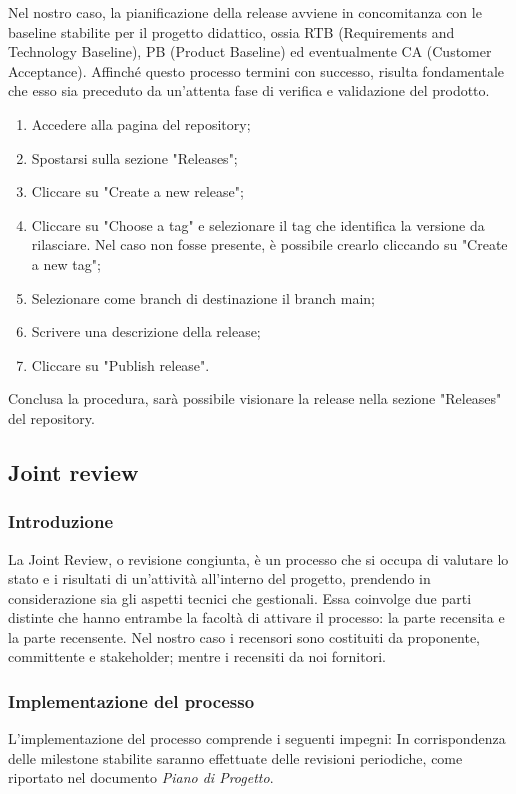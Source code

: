 Nel nostro caso, la pianificazione della release avviene in concomitanza con le baseline stabilite per il progetto didattico, ossia
RTB (Requirements and Technology Baseline),
PB (Product Baseline) ed eventualmente CA (Customer Acceptance).
Affinché questo processo termini con successo, risulta fondamentale che esso sia preceduto da un'attenta fase di verifica e validazione del prodotto.

\begin{enumerate}
	\item Accedere alla pagina del repository;
	\item Spostarsi sulla sezione "Releases";
	\item Cliccare su "Create a new release";
	\item Cliccare su "Choose a tag" e selezionare il tag che identifica la versione da rilasciare. Nel caso non fosse presente, è possibile
	      crearlo cliccando su "Create a new tag";
	\item Selezionare come branch di destinazione il branch main;
	\item Scrivere una descrizione della release;
	\item Cliccare su "Publish release".
\end{enumerate}
Conclusa la procedura, sarà possibile visionare la release nella sezione "Releases" del repository.

\subsection{Joint review}
\subsubsection{Introduzione}
La Joint Review, o revisione congiunta, è un processo che si occupa di valutare lo stato e i risultati di un'attività
all'interno del progetto, prendendo in considerazione sia gli aspetti tecnici che gestionali. Essa coinvolge due parti distinte che hanno entrambe
la facoltà di attivare il processo: la parte recensita e la parte recensente. Nel nostro caso i recensori sono costituiti da
proponente, committente e stakeholder;
mentre i recensiti da noi fornitori.

\subsubsection{Implementazione del processo}
L'implementazione del processo comprende i seguenti impegni:
In corrispondenza delle milestone stabilite saranno effettuate delle revisioni periodiche, come riportato nel
documento \textit{Piano di Progetto}.

